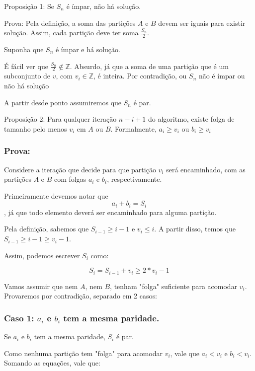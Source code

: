 Proposição 1: Se $S_n$ é ímpar, não há solução.

Prova: Pela definição, a soma das partições $A$ e $B$ devem ser iguais para existir solução. Assim, cada partição deve ter soma $\frac{S_n}{2}$.

Suponha que $S_n$ é ímpar e há solução.

É fácil ver que $\frac{S_n}{2} \not\in \mathbb{Z}$. Absurdo, já que a soma de uma partição que é um subconjunto de $v$, com $v_i \in \mathbb{Z}$, é inteira. Por contradição, ou $S_n$ não é ímpar ou não há solução

A partir desde ponto assumiremos que $S_n$ é par.

Proposição 2: Para qualquer iteração $n - i + 1$ do algoritmo, existe folga de tamanho pelo menos $v_i$ em $A$ ou $B$. Formalmente, $a_i \geq v_i$ ou $b_i \geq v_i$

\subsubsection*{Prova:}

Considere a iteração que decide para que partição $v_i$ será encaminhado, com as partições $A$ e $B$ com folgas $a_i$ e $b_i$, respectivamente.

Primeiramente devemos notar que
\begin{equation} \label{eq:1}
    a_i + b_i = S_i
\end{equation}
, já que todo elemento deverá ser encaminhado para alguma partição.

Pela definição, sabemos que $S_{i - 1} \geq i - 1$ e $v_i \leq i$. A partir disso, temos que $S_{i - 1} \geq i - 1 \geq v_i - 1$.

Assim, podemos escrever $S_i$ como:

\begin{equation} \label{eq:2}
    S_i = S_{i - 1} + v_i \geq 2*v_i - 1
\end{equation}

Vamos assumir que nem $A$, nem $B$, tenham "folga" suficiente para acomodar $v_i$. Provaremos por contradição, separado em 2 casos:

\subsubsection*{Caso 1: $a_i$ e $b_i$ tem a mesma paridade.}

Se $a_i$ e $b_i$ tem a mesma paridade, $S_i$ é par.

Como nenhuma partição tem "folga" para acomodar $v_i$, vale que $a_i < v_i$ e $b_i < v_i$. Somando as equações, vale que:

